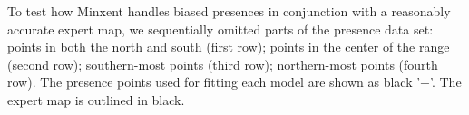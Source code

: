 To test how Minxent handles biased presences in conjunction with a reasonably accurate expert map, we sequentially omitted parts of the presence data set: points in both the north and south (first row); points in the center of the range (second row); southern-most points (third row); northern-most points (fourth row). The presence points used for fitting each model are shown as black '+'. The expert map is outlined in black.